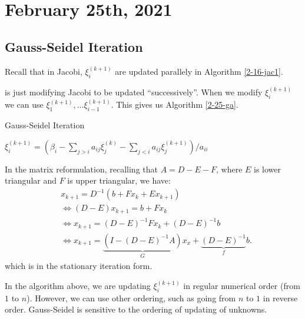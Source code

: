 \documentclass[../main/main.tex]{subfiles}
\begin{document}
\section{February 25th, 2021}
\subsection{Gauss-Seidel Iteration}
Recall that in Jacobi, $\xi_{i}^{(k+1)}$ are updated parallely in Algorithm \ref{2-16-jac1}.

 is just modifying Jacobi to be updated ``successively''. When we modify $\xi_{i}^{(k+1)}$ we can use $\xi_{1}^{(k+1)} ,\ldots \xi_{i-1}^{(k+1)}$. This gives us Algorithm \ref{2-25-ga}.
        \begin{algorithm}[h!]
	\caption{Gauss-Seidel Iteration}
    \label{2-25-ga}
	\begin{algorithmic}[1]
      \State $\xi_{i}^{(k+1)} = (\beta_{i} - \sum_{j> i} a_{ij} \xi_{j}^{(k) } - \sum_{j< i} a_{ij} \xi_{j}^{(k+1) } ) / a_{ii}$
      \EndFor
      \EndFor
	\end{algorithmic}
	\end{algorithm}

    In the matrix reformulation, recalling that $A=D-E-F$, where $E$ is lower triangular and $F$ is upper triangular, we have: \[
    \]
    \begin{align*}
     & x_{k+1} = D^{-1}(b+F x_{k}+E x_{k+1}) \\
      &\iff (D-E)x_{k+1} = b +F x_{k} \\
   & \iff x_{k+1} = (D-E)^{-1} F x_{k} + (D-E)^{-1} b \\
    &  \iff x_{k+1} = \underbrace{(I - (D-E)^{-1} A)}_{G} x_{x} + \underbrace{(D-E)^{-1}}_{f} b
                     .\end{align*}
                   which is in the stationary iteration form.\\

                   \begin{remark}
In the algorithm above, we are updating $\xi_{i}^{(k+1)}$ in regular numerical order (from $1$ to $n$). However, we can use other ordering, such as going from $n$ to $1$ in reverse order. Gauss-Seidel is sensitive to the ordering of updating of unknowns.
                   \end{remark}
\end{document}
